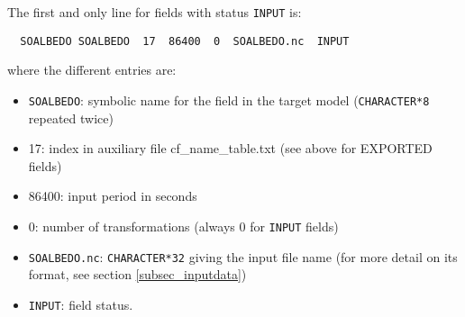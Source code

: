   The first and only line for fields with status {\tt INPUT} is:

  \begin{verbatim}
  SOALBEDO SOALBEDO  17  86400  0  SOALBEDO.nc  INPUT\end{verbatim} where the different entries are:
  \begin{itemize}
  \item  {\tt SOALBEDO}: symbolic name for the field in the target
  model ({\tt CHARACTER*8} repeated twice)
  \item 17:  index in auxiliary file cf\_name\_table.txt (see above for EXPORTED fields)
  \item 86400: input period in seconds
  \item 0: number of transformations (always 0 for {\tt INPUT} fields)
  \item {\tt SOALBEDO.nc}: {\tt CHARACTER*32} giving the input file
  name (for more detail on its format, see section
  \ref{subsec_inputdata})
  \item {\tt INPUT}: field status.
  \end{itemize}

